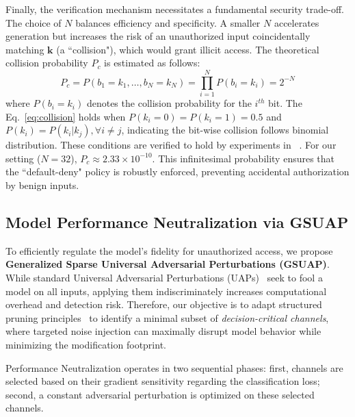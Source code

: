 \documentclass[conference]{IEEEtran}
\begin{document}
Finally, the verification mechanism necessitates a fundamental security trade-off. The choice of $N$ balances efficiency and specificity. A smaller $N$ accelerates generation but increases the risk of an unauthorized input coincidentally matching $\mathbf{k}$ (a ``collision"), which would grant illicit access. The theoretical collision probability $P_c$ is estimated as follows:
\begin{equation}
\label{eq:collision}
    P_c = P(b_1=k_1, \dots, b_N=k_N) = \prod_{i=1}^{N} P(b_i=k_i) = 2^{-N}
\end{equation}
where $P(b_i = k_i)$ denotes the collision probability for the $i^{th}$ bit. The Eq.~\ref{eq:collision} holds when $P(k_i = 0) = P(k_i = 1) = 0.5$ and $P(k_i) = P(k_i|k_j), \forall i \neq j$, indicating the bit-wise collision follows binomial distribution. These conditions are verified to hold by experiments in ~\cite{liu2022loneneuron}. For our setting ($N=32$), $P_c \approx 2.33 \times 10^{-10}$. This infinitesimal probability ensures that the ``default-deny" policy is robustly enforced, preventing accidental authorization by benign inputs. 

\subsection{Model Performance Neutralization via GSUAP}
\label{sec: GSUAP}

To efficiently regulate the model's fidelity for unauthorized access, we propose \textbf{Generalized Sparse Universal Adversarial Perturbations (GSUAP)}. While standard Universal Adversarial Perturbations (UAPs)~\cite{moosavi2017universal, mopuri2018generalizable} seek to fool a model on all inputs, applying them indiscriminately increases computational overhead and detection risk. Therefore, our objective is to adapt structured pruning principles~\cite{molchanov2016pruning, li2016pruning} to identify a minimal subset of \textit{decision-critical channels}, where targeted noise injection can maximally disrupt model behavior while minimizing the modification footprint.

Performance Neutralization operates in two sequential phases: first, channels are selected based on their gradient sensitivity regarding the classification loss; second, a constant adversarial perturbation is optimized on these selected channels.
\end{document}
